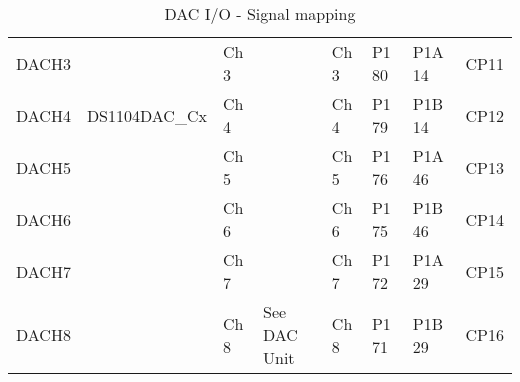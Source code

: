 \begin{table}[H]
\begin{adjustbox}{width=1\textwidth}
\begin{tabular}{|llllllll|}
\multicolumn{1}{|l|}{DACH3} &
  \multicolumn{1}{l|}{} &
  \multicolumn{1}{l|}{Ch 3} &
  \multicolumn{1}{l|}{} &
  \multicolumn{1}{l|}{Ch 3} &
  \multicolumn{1}{l|}{P1 80} &
  \multicolumn{1}{l|}{P1A 14} &
  CP11 \\
\multicolumn{1}{|l|}{DACH4} &
  \multicolumn{1}{l|}{\multirow[t]{-4}{*}{DS1104DAC\_Cx}} &
  \multicolumn{1}{l|}{Ch 4} &
  \multicolumn{1}{l|}{} &
  \multicolumn{1}{l|}{Ch 4} &
  \multicolumn{1}{l|}{P1 79} &
  \multicolumn{1}{l|}{P1B 14} &
  CP12 \\
\multicolumn{1}{|l|}{DACH5} &
  \multicolumn{1}{l|}{} &
  \multicolumn{1}{l|}{Ch 5} &
  \multicolumn{1}{l|}{} &
  \multicolumn{1}{l|}{Ch 5} &
  \multicolumn{1}{l|}{P1 76} &
  \multicolumn{1}{l|}{P1A 46} &
  CP13 \\
\multicolumn{1}{|l|}{DACH6} &
  \multicolumn{1}{l|}{} &
  \multicolumn{1}{l|}{Ch 6} &
  \multicolumn{1}{l|}{} &
  \multicolumn{1}{l|}{Ch 6} &
  \multicolumn{1}{l|}{P1 75} &
  \multicolumn{1}{l|}{P1B 46} &
  CP14 \\
\multicolumn{1}{|l|}{DACH7} &
  \multicolumn{1}{l|}{} &
  \multicolumn{1}{l|}{Ch 7} &
  \multicolumn{1}{l|}{} &
  \multicolumn{1}{l|}{Ch 7} &
  \multicolumn{1}{l|}{P1 72} &
  \multicolumn{1}{l|}{P1A 29} &
  CP15 \\
\multicolumn{1}{|l|}{DACH8} &
  \multicolumn{1}{l|}{} &
  \multicolumn{1}{l|}{Ch 8} &
  \multicolumn{1}{l|}{\multirow[t]{-8}{*}{See DAC Unit}} &
  \multicolumn{1}{l|}{Ch 8} &
  \multicolumn{1}{l|}{P1 71} &
  \multicolumn{1}{l|}{P1B 29} &
  CP16 \\ \hline
\end{tabular}
\end{adjustbox}
\caption{DAC I/O - Signal mapping }
\label{DACSignalMapping}
\end{table}